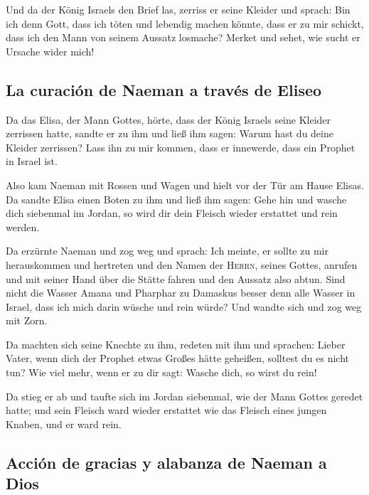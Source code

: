  Und da der König Israels den Brief las, zerriss er seine
Kleider und sprach: Bin ich denn Gott, dass ich töten und lebendig
machen könnte, dass er zu mir schickt, dass ich den Mann von seinem
Aussatz losmache? Merket und sehet, wie sucht er Ursache wider mich!

\hypertarget{la-curaciuxf3n-de-naeman-a-travuxe9s-de-eliseo}{%
\subsection{La curación de Naeman a través de
Eliseo}\label{la-curaciuxf3n-de-naeman-a-travuxe9s-de-eliseo}}

 Da das Elisa, der Mann Gottes, hörte, dass der König
Israels seine Kleider zerrissen hatte, sandte er zu ihm und ließ ihm
sagen: Warum hast du deine Kleider zerrissen? Lass ihn zu mir kommen,
dass er innewerde, dass ein Prophet in Israel ist.

 Also kam Naeman mit Rossen und Wagen und hielt vor der
Tür am Hause Elisas.  Da sandte Elisa einen Boten zu ihm
und ließ ihm sagen: Gehe hin und wasche dich siebenmal im Jordan, so
wird dir dein Fleisch wieder erstattet und rein werden.

 Da erzürnte Naeman und zog weg und sprach: Ich meinte,
er sollte zu mir herauskommen und hertreten und den Namen der
\textsc{Herrn}, seines Gottes, anrufen und mit seiner Hand über die
Stätte fahren und den Aussatz also abtun.  Sind nicht die
Wasser Amana und Pharphar zu Damaskus besser denn alle Wasser in Israel,
dass ich mich darin wüsche und rein würde? Und wandte sich und zog weg
mit Zorn.

 Da machten sich seine Knechte zu ihm, redeten mit ihm
und sprachen: Lieber Vater, wenn dich der Prophet etwas Großes hätte
geheißen, solltest du es nicht tun? Wie viel mehr, wenn er zu dir sagt:
Wasche dich, so wirst du rein!

 Da stieg er ab und taufte sich im Jordan siebenmal, wie
der Mann Gottes geredet hatte; und sein Fleisch ward wieder erstattet
wie das Fleisch eines jungen Knaben, und er ward rein.

\hypertarget{acciuxf3n-de-gracias-y-alabanza-de-naeman-a-dios}{%
\subsection{Acción de gracias y alabanza de Naeman a
Dios}\label{acciuxf3n-de-gracias-y-alabanza-de-naeman-a-dios}}

